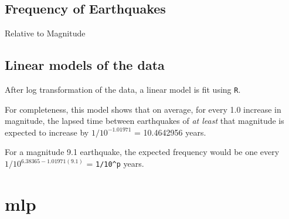 \documentclass[
]{article}
\newenvironment{Shaded}{\begin{snugshade}}{\end{snugshade}}
\newcommand{\CommentTok}[1]{\textcolor[rgb]{0.56,0.35,0.01}{\textit{#1}}}
\newcommand{\ControlFlowTok}[1]{\textcolor[rgb]{0.13,0.29,0.53}{\textbf{#1}}}
\newcommand{\DecValTok}[1]{\textcolor[rgb]{0.00,0.00,0.81}{#1}}
\newcommand{\FunctionTok}[1]{\textcolor[rgb]{0.00,0.00,0.00}{#1}}
\newcommand{\NormalTok}[1]{#1}
\newcommand{\OtherTok}[1]{\textcolor[rgb]{0.56,0.35,0.01}{#1}}
\newcommand{\SpecialCharTok}[1]{\textcolor[rgb]{0.00,0.00,0.00}{#1}}
\begin{document}
\begin{Shaded}
\end{Shaded}

\hypertarget{frequency-of-earthquakes}{%
\subsection{Frequency of Earthquakes}\label{frequency-of-earthquakes}}

Relative to Magnitude

\hypertarget{linear-models-of-the-data}{%
\subsection{Linear models of the data}\label{linear-models-of-the-data}}

After log transformation of the data, a linear model is fit using
\texttt{R}.

For completeness, this model shows that on average, for every 1.0
increase in magnitude, the lapsed time between earthquakes of \emph{at
least} that magnitude is expected to increase by \(1/10^{-1.01971}\) =
10.4642956 years.

For a magnitude 9.1 earthquake, the expected frequency would be one
every \(1/10^{6.38365-1.01971(9.1)}\) = \texttt{1/10\^{}p} years.

\hypertarget{mlp}{%
\section{mlp}\label{mlp}}
\end{document}
